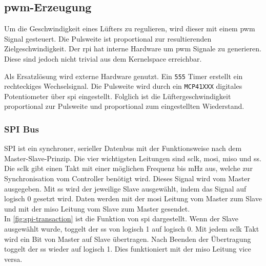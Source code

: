 \subsection{\Acrshort{pwm}-Erzeugung}

Um die Geschwindigkeit eines Lüfters zu regulieren, wird dieser mit einem \gls{pwm} Signal gesteuert.
Die Pulsweite ist proportional zur resultierenden Zielgeschwindigkeit.
Der \gls{rpi} hat interne Hardware um \gls{pwm} Signale zu generieren.
Diese sind jedoch nicht trivial aus dem Kernelspace erreichbar.

Als Ersatzlösung wird externe Hardware genutzt.
Ein \texttt{555} Timer erstellt ein rechteckiges Wechselsignal.
Die Pulsweite wird durch ein \texttt{MCP41XXX} digitales Potentiometer über \gls{spi} eingestellt.
Folglich ist die Lüftergeschwindigkeit proportional zur Pulsweite und proportional zum eingestellten Wiederstand.

\subsubsection{SPI Bus}

SPI ist ein synchroner, serieller Datenbus mit der Funktionsweise nach dem Master-Slave-Prinzip.
Die vier wichtigsten Leitungen sind \gls{sclk}, \gls{mosi}, \gls{miso} und \gls{ss}.
Die \gls{sclk} gibt einen Takt mit einer möglichen Frequenz bis $\si{\mHz}$ aus, welche zur Synchronisation vom Controller benötigt wird. Dieses Signal wird vom Master ausgegeben.
Mit \gls{ss} wird der jeweilige Slave ausgewählt, indem das Signal auf logisch 0 gesetzt wird.
Daten werden mit der \gls{mosi} Leitung vom Master zum Slave und mit der \gls{miso} Leitung vom Slave zum Master gesendet. \\
In \autoref{fig:spi-transaction} ist die Funktion von \gls{spi} dargestellt.
Wenn der Slave ausgewählt wurde, toggelt der \gls{ss} von logisch 1 auf logisch 0.
Mit jedem \gls{sclk} Takt wird ein Bit von Master auf Slave übertragen.
Nach Beenden der Übertragung toggelt der \gls{ss} wieder auf logisch 1.
Dies funktioniert mit der \gls{miso} Leitung vice versa.

